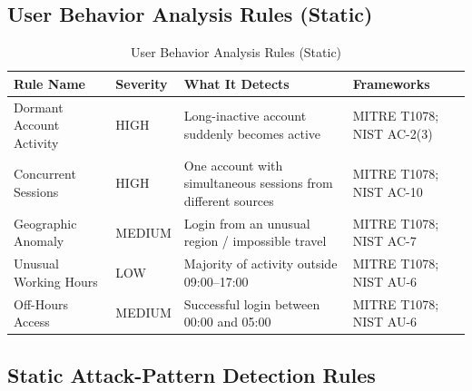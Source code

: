 \documentclass[12pt,a4paper]{article}
\begin{document}
\subsection{User Behavior Analysis Rules (Static)}

\begin{table}[H]
\centering
\begin{tabular}{|p{4.2cm}|p{1.7cm}|p{4.6cm}|p{4.2cm}|}
\hline
\textbf{Rule Name} & \textbf{Severity} & \textbf{What It Detects} & \textbf{Frameworks} \\
\hline
Dormant Account Activity & HIGH & Long-inactive account suddenly becomes active & MITRE T1078; NIST AC-2(3) \\
\hline
Concurrent Sessions & HIGH & One account with simultaneous sessions from different sources & MITRE T1078; NIST AC-10 \\
\hline
Geographic Anomaly & MEDIUM & Login from an unusual region / impossible travel & MITRE T1078; NIST AC-7 \\
\hline
Unusual Working Hours & LOW & Majority of activity outside 09:00--17:00 & MITRE T1078; NIST AU-6 \\
\hline
Off-Hours Access & MEDIUM & Successful login between 00:00 and 05:00 & MITRE T1078; NIST AU-6 \\
\hline
\end{tabular}
\caption{User Behavior Analysis Rules (Static)}
\label{tab:user-behavior-rules}
\end{table}

\subsection{Static Attack-Pattern Detection Rules}
\end{document}
